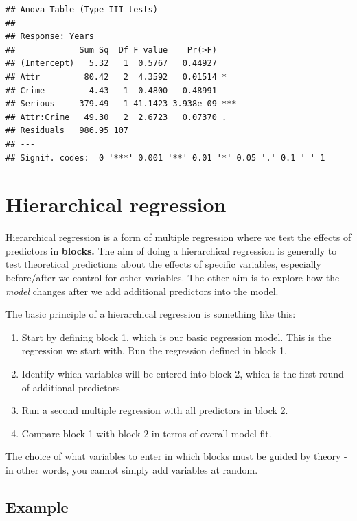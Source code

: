\documentclass[
]{book}
\providecommand{\tightlist}{%
  \setlength{\itemsep}{0pt}\setlength{\parskip}{0pt}}
\begin{document}
\begin{verbatim}
## Anova Table (Type III tests)
## 
## Response: Years
##             Sum Sq  Df F value    Pr(>F)    
## (Intercept)   5.32   1  0.5767   0.44927    
## Attr         80.42   2  4.3592   0.01514 *  
## Crime         4.43   1  0.4800   0.48991    
## Serious     379.49   1 41.1423 3.938e-09 ***
## Attr:Crime   49.30   2  2.6723   0.07370 .  
## Residuals   986.95 107                      
## ---
## Signif. codes:  0 '***' 0.001 '**' 0.01 '*' 0.05 '.' 0.1 ' ' 1
\end{verbatim}

\hypertarget{hierarchical-regression}{%
\section{Hierarchical regression}\label{hierarchical-regression}}

Hierarchical regression is a form of multiple regression where we test the effects of predictors in \textbf{blocks.} The aim of doing a hierarchical regression is generally to test theoretical predictions about the effects of specific variables, especially before/after we control for other variables. The other aim is to explore how the \emph{model} changes after we add additional predictors into the model.

The basic principle of a hierarchical regression is something like this:

\begin{enumerate}
\def\labelenumi{\arabic{enumi}.}
\tightlist
\item
  Start by defining block 1, which is our basic regression model. This is the regression we start with. Run the regression defined in block 1.
\item
  Identify which variables will be entered into block 2, which is the first round of additional predictors
\item
  Run a second multiple regression with all predictors in block 2.
\item
  Compare block 1 with block 2 in terms of overall model fit.
\end{enumerate}

The choice of what variables to enter in which blocks must be guided by theory - in other words, you cannot simply add variables at random.

\hypertarget{example-7}{%
\subsection{Example}\label{example-7}}
\end{document}
